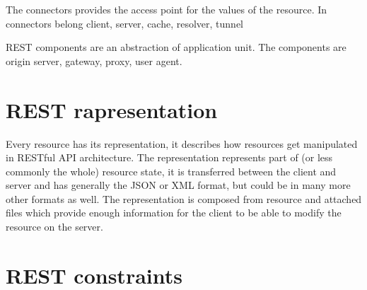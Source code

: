 The connectors provides the access point for the values of the resource. In connectors belong client, server, cache, resolver, tunnel 

REST components are an abstraction of application unit. The components are origin server, gateway, proxy, user agent.


\section{REST rapresentation}
Every resource has its representation, it describes how resources get manipulated in RESTful  API architecture. The representation represents part of (or less commonly the whole) resource state, it is transferred between the client and server and has generally the JSON or XML format, but could be in many more other formats as well. The representation is composed from resource and attached files which provide enough information for the client to be able to modify the resource on the server.

\section{REST constraints}

